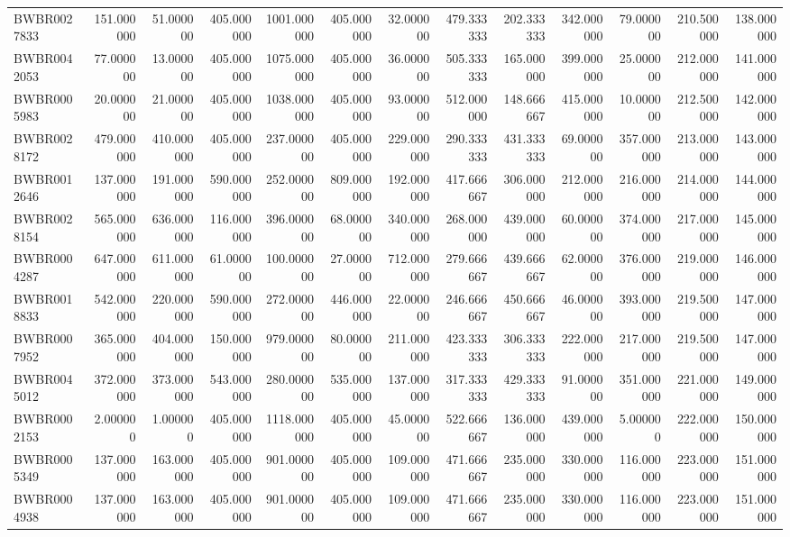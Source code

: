 \begin{longtable}{lrrrrrrrrrrrr}
BWBR0027833 & 151.000000 & 51.000000 & 405.000000 & 1001.000000 & 405.000000 & 32.000000 & 479.333333 & 202.333333 & 342.000000 & 79.000000 & 210.500000 & 138.000000 \\
BWBR0042053 & 77.000000 & 13.000000 & 405.000000 & 1075.000000 & 405.000000 & 36.000000 & 505.333333 & 165.000000 & 399.000000 & 25.000000 & 212.000000 & 141.000000 \\
BWBR0005983 & 20.000000 & 21.000000 & 405.000000 & 1038.000000 & 405.000000 & 93.000000 & 512.000000 & 148.666667 & 415.000000 & 10.000000 & 212.500000 & 142.000000 \\
BWBR0028172 & 479.000000 & 410.000000 & 405.000000 & 237.000000 & 405.000000 & 229.000000 & 290.333333 & 431.333333 & 69.000000 & 357.000000 & 213.000000 & 143.000000 \\
BWBR0012646 & 137.000000 & 191.000000 & 590.000000 & 252.000000 & 809.000000 & 192.000000 & 417.666667 & 306.000000 & 212.000000 & 216.000000 & 214.000000 & 144.000000 \\
BWBR0028154 & 565.000000 & 636.000000 & 116.000000 & 396.000000 & 68.000000 & 340.000000 & 268.000000 & 439.000000 & 60.000000 & 374.000000 & 217.000000 & 145.000000 \\
BWBR0004287 & 647.000000 & 611.000000 & 61.000000 & 100.000000 & 27.000000 & 712.000000 & 279.666667 & 439.666667 & 62.000000 & 376.000000 & 219.000000 & 146.000000 \\
BWBR0018833 & 542.000000 & 220.000000 & 590.000000 & 272.000000 & 446.000000 & 22.000000 & 246.666667 & 450.666667 & 46.000000 & 393.000000 & 219.500000 & 147.000000 \\
BWBR0007952 & 365.000000 & 404.000000 & 150.000000 & 979.000000 & 80.000000 & 211.000000 & 423.333333 & 306.333333 & 222.000000 & 217.000000 & 219.500000 & 147.000000 \\
BWBR0045012 & 372.000000 & 373.000000 & 543.000000 & 280.000000 & 535.000000 & 137.000000 & 317.333333 & 429.333333 & 91.000000 & 351.000000 & 221.000000 & 149.000000 \\
BWBR0002153 & 2.000000 & 1.000000 & 405.000000 & 1118.000000 & 405.000000 & 45.000000 & 522.666667 & 136.000000 & 439.000000 & 5.000000 & 222.000000 & 150.000000 \\
BWBR0005349 & 137.000000 & 163.000000 & 405.000000 & 901.000000 & 405.000000 & 109.000000 & 471.666667 & 235.000000 & 330.000000 & 116.000000 & 223.000000 & 151.000000 \\
BWBR0004938 & 137.000000 & 163.000000 & 405.000000 & 901.000000 & 405.000000 & 109.000000 & 471.666667 & 235.000000 & 330.000000 & 116.000000 & 223.000000 & 151.000000 \\

\end{longtable}

